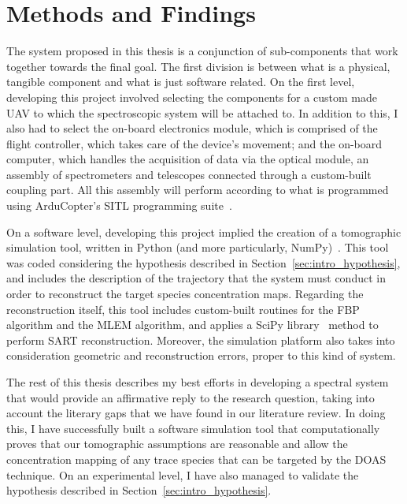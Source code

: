 

\section{Methods and Findings}%
\label{sec:intro_methods}


The system proposed in this thesis is a conjunction of sub-components
that work together towards the final goal. The first division is between
what is a physical, tangible component and what is just software
related. On the first level, developing this project involved selecting
the components for a custom made \gls{UAV} to which the spectroscopic
system will be attached to. In addition to this, I also had to select
the on-board electronics module, which is comprised of the flight
controller, which takes care of the device's movement; and the on-board
computer, which handles the acquisition of data via the optical module,
an assembly of spectrometers and telescopes connected through a
custom-built coupling part. All this assembly will perform according to
what is programmed using ArduCopter's SITL programming
suite~.

On a software level, developing this project implied the creation of a
tomographic simulation tool, written in Python (and more particularly,
NumPy)~\cite{Python, Oliphant2007}. This tool was coded considering the
hypothesis described in Section~\ref{sec:intro_hypothesis}, and includes the
description of the trajectory that the system must conduct in order to
reconstruct the target species concentration maps. Regarding the
reconstruction itself, this tool includes custom-built routines for the
\gls{FBP} algorithm and the \gls{MLEM} algorithm, and applies a SciPy
library~ method to perform \gls{SART} reconstruction.
Moreover, the simulation platform also takes into consideration
geometric and reconstruction errors, proper to this kind of system.

The rest of this thesis describes my best efforts in developing a
spectral system that would provide an affirmative reply to the research
question, taking into account the literary gaps that we have found in
our literature review. In doing this, I have successfully built a
software simulation tool that computationally proves that our
tomographic assumptions are reasonable and allow the concentration
mapping of any trace species that can be targeted by the \gls{DOAS}
technique. On an experimental level, I have also managed to validate the
hypothesis described in Section~\ref{sec:intro_hypothesis}.

